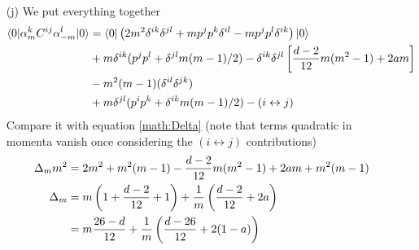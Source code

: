 \begin{enumerate}[label=(\alph*)]
	\item[(j)]  We put everything together
		\begin{align}
			\begin{split}
			\braket{0 | \alpha^k_m C^{ij} \alpha^l_{-m} | 0} &= \braket{0 | \left( 2m^2\delta^{ik}\delta^{jl} + mp^j p^k \delta^{il} - mp^j p^l \delta^{ik} \right) | 0} \\
																			 &+m\delta^{ik} (p^jp^l + \delta^{jl}m(m-1)/2) - \delta^{ik}\delta^{jl} \left[ \frac{d-2}{12}m(m^2-1) + 2am \right] \\
																			 &- m^2 (m-1) (\delta^{il} \delta^{jk})  \\
																			 &+ m \delta^{jl} (p^i p^k + \delta^{ik} m(m-1)/2) - (i \leftrightarrow j)
			\end{split}
		\end{align}
		Compare it with equation \eqref{math:Delta} (note that terms quadratic in momenta vanish once considering the $(i\leftrightarrow j)$ contributions)
		\begin{align}
			\Delta_m m^2 &= 2m^2 + m^2 (m-1) - \frac{d-2}{12} m(m^2-1) + 2am + m^2 (m-1) \notag \\
					\Delta_m	 &= m \left( 1 + \frac{d-2}{12} + 1 \right) + \frac{1}{m} \left( \frac{d-2}{12} + 2a \right) \notag \\
							 &= m \frac{26-d}{12} + \frac{1}{m} \left( \frac{d-26}{12} + 2(1-a) \right)
		\end{align}
\end{enumerate}

